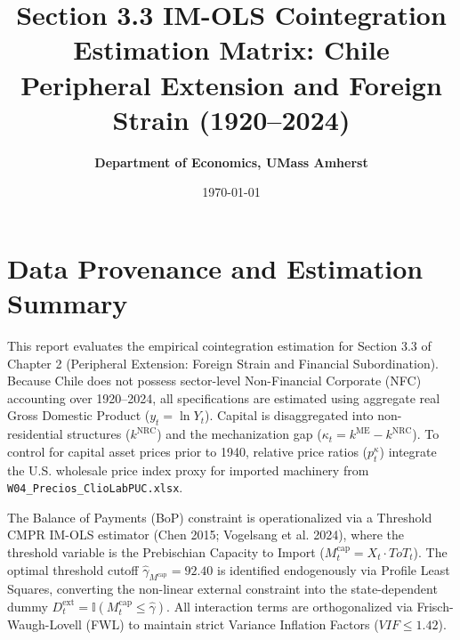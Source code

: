 \documentclass[11pt,a4paper]{article}
\title{\textbf{Section 3.3 IM-OLS Cointegration Estimation Matrix: Chile Peripheral Extension and Foreign Strain (1920--2024)}}
\author{\textbf{Department of Economics, UMass Amherst}}
\date{\today}
\begin{document}
\maketitle

\section*{Data Provenance and Estimation Summary}
This report evaluates the empirical cointegration estimation for Section 3.3 of Chapter 2 (Peripheral Extension: Foreign Strain and Financial Subordination). Because Chile does not possess sector-level Non-Financial Corporate (NFC) accounting over 1920--2024, all specifications are estimated using aggregate real Gross Domestic Product ($y_t = \ln Y_t$). Capital is disaggregated into non-residential structures ($k^{\text{NRC}}$) and the mechanization gap ($\kappa_t = k^{\text{ME}} - k^{\text{NRC}}$). To control for capital asset prices prior to 1940, relative price ratios ($p_t^{\kappa}$) integrate the U.S. wholesale price index proxy for imported machinery from \texttt{W04\_Precios\_ClioLabPUC.xlsx}.

The Balance of Payments (BoP) constraint is operationalized via a Threshold CMPR IM-OLS estimator (Chen 2015; Vogelsang et al. 2024), where the threshold variable is the Prebischian Capacity to Import ($M^{\text{cap}}_t = X_t \cdot ToT_t$). The optimal threshold cutoff $\hat{\gamma}_{M^{\text{cap}}} = 92.40$ is identified endogenously via Profile Least Squares, converting the non-linear external constraint into the state-dependent dummy $D^{\text{ext}}_t = \mathbb{I}(M^{\text{cap}}_t \le \hat{\gamma})$. All interaction terms are orthogonalized via Frisch-Waugh-Lovell (FWL) to maintain strict Variance Inflation Factors ($VIF \le 1.42$).
\end{document}
